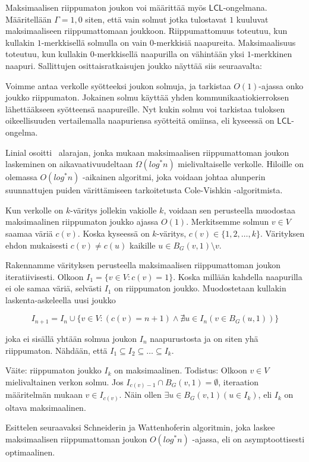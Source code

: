 \documentclass[12pt,finnish]{tktltiki2}
\theoremstyle{definition}
\theoremstyle{remark}
\newcommand*{\lcl}{\ensuremath{\mathsf{LCL}}}
\begin{document}
Maksimaalisen riippumaton joukon voi määrittää myös \lcl -ongelmana. Määritellään $\Gamma = {1, 0}$ siten, että vain solmut jotka tulostavat $1$ kuuluvat maksimaaliseen riippumattomaan joukkoon. Riippumattomuus toteutuu, kun kullakin $1$-merkkisellä solmulla on vain $0$-merkkisiä naapureita. Maksimaalisuus toteutuu, kun kullakin $0$-merkkisellä naapurilla on vähintään yksi $1$-merkkinen naapuri. Sallittujen osittaisratkaisujen joukko näyttää siis seuraavalta:

Voimme antaa verkolle syötteeksi joukon solmuja, ja tarkistaa $O(1)$-ajassa onko joukko riippumaton. Jokainen solmu käyttää yhden kommunikaatiokierroksen lähettääkseen syötteensä naapureille. Nyt kukin solmu voi tarkistaa tuloksen oikeellisuuden vertailemalla naapuriensa syötteitä omiinsa, eli kyseessä on \lcl -ongelma.

Linial osoitti~\cite{linial92} alarajan, jonka mukaan maksimaalisen riippumattoman joukon laskeminen on aikavaativuudeltaan $\Omega(log^* n)$ mielivaltaiselle verkolle. Hiloille on olemassa $O(log^* n)$ -aikainen algoritmi, joka voidaan johtaa alunperin suunnattujen puiden värittämiseen tarkoitetusta Cole-Vishkin -algoritmista.

Kun verkolle on $k$-väritys jollekin vakiolle $k$, voidaan sen perusteella muodostaa maksimaalinen riippumaton joukko ajassa $O(1)$. Merkitsemme solmun $v \in V$ saamaa väriä $c(v)$. Koska kyseessä on $k$-väritys, $c(v) \in \{1, 2, \ldots, k\}$. Värityksen ehdon mukaisesti $c(v) \neq c(u)$ kaikille $u \in B_G(v, 1) \setminus {v}$.

Rakennamme värityksen perusteella maksimaalisen riippumattoman joukon iteratiivisesti. Olkoon $I_1 = \{ v \in V : c(v) = 1 \}$. Koska millään kahdella naapurilla ei ole samaa väriä, selvästi $I_1$ on riippumaton joukko. Muodostetaan kullakin laskenta-askeleella uusi joukko

$$I_{n+1} = I_n \cup \{ v \in V : (c(v) = n+1) \land \nexists u \in I_n (v \in B_G(u, 1)) \}$$

joka ei sisällä yhtään solmua joukon $I_n$ naapurustosta ja on siten yhä riippumaton. Nähdään, että $I_1 \subseteq I_2 \subseteq \ldots \subseteq I_k$.

Väite: riippumaton joukko $I_k$ on maksimaalinen. Todistus: Olkoon $v \in V$ mielivaltainen verkon solmu. Jos $I_{c(v)-1} \cap B_G(v, 1) = \emptyset$, iteraation määritelmän mukaan $v \in I_{c(v)}$. Näin ollen $\exists u \in B_G(v, 1) (u \in I_k)$, eli $I_k$ on oltava maksimaalinen.


Esittelen seuraavaksi Schneiderin ja Wattenhoferin algoritmin, joka laskee maksimaalisen riippumattoman joukon $O(log^* n)$ -ajassa, eli on asymptoottisesti optimaalinen.
\end{document}

